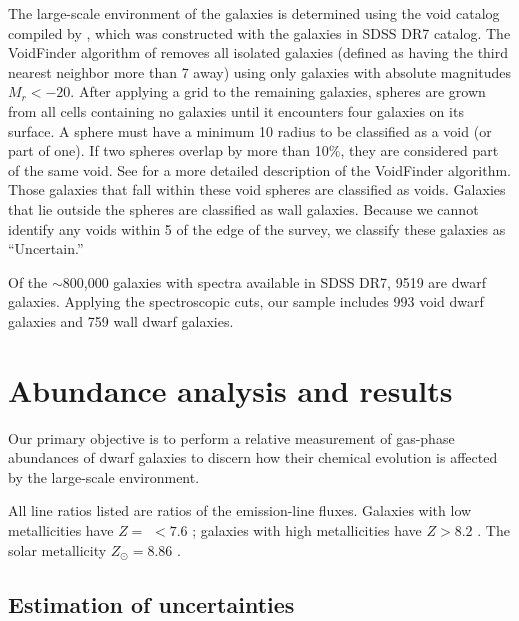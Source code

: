 The large-scale environment of the galaxies is determined using the void catalog 
compiled by \cite{Pan12}, which was constructed with the galaxies in SDSS DR7 
catalog.  The VoidFinder algorithm of \cite{Hoyle02} \citep[based on the 
algorithm described by][]{ElAd97} removes all isolated galaxies (defined as 
having the third nearest neighbor more than 7 \hMpc away) using only galaxies 
with absolute magnitudes $M_r < -20$.  After applying a grid to the remaining 
galaxies, spheres are grown from all cells containing no galaxies until it 
encounters four galaxies on its surface.  A sphere must have a minimum 10 \hMpc 
radius to be classified as a void (or part of one).  If two spheres overlap by 
more than 10\%, they are considered part of the same void.  See \cite{Hoyle02} 
for a more detailed description of the VoidFinder algorithm.  Those galaxies 
that fall within these void spheres are classified as voids.  Galaxies that lie 
outside the spheres are classified as wall galaxies.  Because we cannot identify 
any voids within 5 \hMpc of the edge of the survey, we classify these galaxies 
as ``Uncertain.''

Of the $\sim$800,000 galaxies with spectra available in SDSS DR7, 9519 are 
dwarf galaxies.  Applying the spectroscopic cuts, our sample includes 993 void 
dwarf galaxies and 759 wall dwarf galaxies.


%
%
\section[Analysis \& Results]{Abundance analysis and results}

Our primary objective is to perform a relative measurement of gas-phase 
abundances of dwarf galaxies to discern how their chemical evolution is affected 
by the large-scale environment.

All line ratios listed are ratios of the emission-line fluxes.  Galaxies with 
low metallicities have $Z =$ \OH $< 7.6$ \citep{Pustilnik06}; galaxies with high 
metallicities have $Z > 8.2$ \citep{Pilyugin06}.  The solar metallicity 
$Z_\odot = 8.86$ \citep{Delahaye06}.


\subsection{Estimation of uncertainties}

